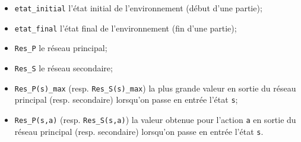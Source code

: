 \begin{itemize}
	\item \verb|etat_initial| l'état initial de l'environnement (début d'une partie);
	\item \verb|etat_final| l'état final de l'environnement (fin d'une partie);
	\item \verb|Res_P| le réseau principal;
	\item \verb|Res_S| le réseau secondaire;
	\item \verb|Res_P(s)_max| (resp. \verb|Res_S(s)_max|) la plus grande valeur en sortie du réseau principal (resp. secondaire) lorsqu'on passe en entrée l'état \verb|s|;
	\item \verb|Res_P(s,a)| (resp. \verb|Res_S(s,a)|) la valeur obtenue pour l'action \verb|a| en sortie du réseau principal (resp. secondaire) lorsqu'on passe en entrée l'état \verb|s|.
\end{itemize}

\newpage

\small

